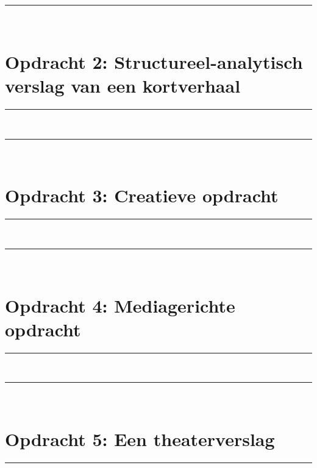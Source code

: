 \newpage
\vspace*{\fill}
\begin{center}
\newcommand{\HRule}{\rule{\linewidth}{0.5mm}}
\HRule \\[0.4cm]
\section*{Opdracht 2: Structureel-analytisch verslag van een kortverhaal \cite{2}}
\HRule \\[1.5cm]
\end{center}
\vspace*{\fill}
   
%

\newpage
\vspace*{\fill}
\begin{center}
\newcommand{\HRule}{\rule{\linewidth}{0.5mm}}
\HRule \\[0.4cm]
\section*{Opdracht 3: Creatieve opdracht \cite{3}}
\HRule \\[1.5cm]
\end{center}
\vspace*{\fill}
   
%

\newpage
\vspace*{\fill}
\begin{center}
\newcommand{\HRule}{\rule{\linewidth}{0.5mm}}
\HRule \\[0.4cm]
\section*{Opdracht 4: Mediagerichte opdracht \cite{4}}
\HRule \\[1.5cm]
\end{center}
\vspace*{\fill}
   
%

\newpage
\vspace*{\fill}
\begin{center}
\newcommand{\HRule}{\rule{\linewidth}{0.5mm}}
\HRule \\[0.4cm]
\section*{Opdracht 5: Een theaterverslag \cite{5}}
\HRule \\[1.5cm]
\end{center}
\vspace*{\fill}
   
